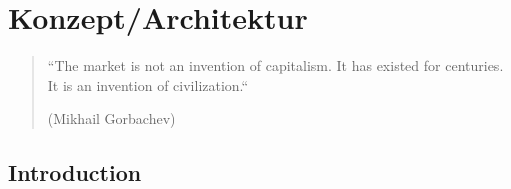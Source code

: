 
\chapter{Konzept/Architektur} \label{chapter:architecture}

\begin{quotation}
``The market is not an invention of capitalism. It has existed for centuries. It is an invention of civilization.``
\begin{flushright}
(Mikhail Gorbachev)
\end{flushright}
\end{quotation}





\section{Introduction}
